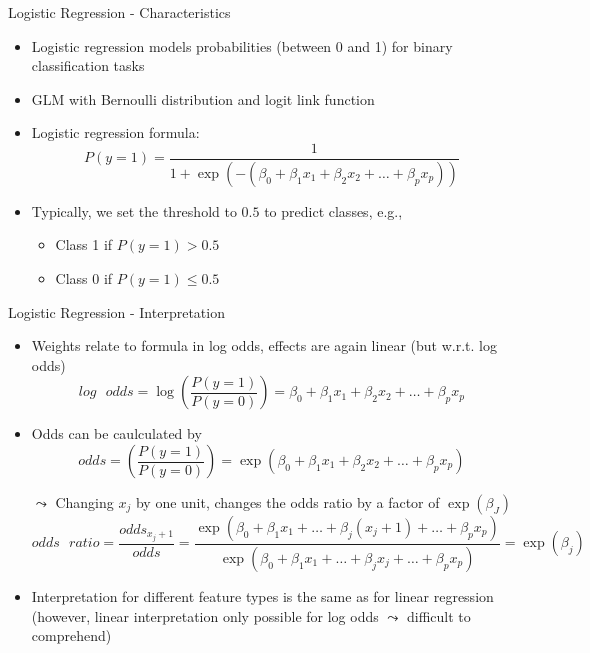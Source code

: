 \documentclass[11pt,compress,t,notes=noshow, aspectratio=169, xcolor=table]{beamer}
\begin{document}
\begin{frame}{Logistic Regression - Characteristics}

\begin{itemize}
    \item Logistic regression models probabilities (between 0 and 1) for binary classification tasks 
    \item GLM with Bernoulli distribution and logit link function
    \item Logistic regression formula:
    $$P(y = 1) =\frac{1}{1 + \exp(-( \beta_0 + \beta_1 x_1 + \beta_2 x_2 + \ldots + \beta_p x_p ))} $$
    \item Typically, we set the threshold to $0.5$ to predict classes, e.g.,
        \begin{itemize}
            \item Class 1 if $P(y=1) > 0.5$
            \item Class 0 if $P(y=1) \leq 0.5$
        \end{itemize}
\end{itemize}
    

	

\end{frame}


\begin{frame}[c]{Logistic Regression - Interpretation}

    
    
    
    

    \begin{itemize}
        \item Weights relate to formula in log odds, effects are again linear (but w.r.t. log odds)
        $$log\text{ }odds = \log \left(\frac{P(y = 1)}{P(y=0)}\right) = \beta_0 + \beta_1 x_1 + \beta_2 x_2 + \ldots + \beta_p x_p  $$
        \pause
        \item Odds can be caulculated by 
        $$odds = \left(\frac{P(y = 1)}{P(y=0)}\right) = \exp(\beta_0 + \beta_1 x_1 + \beta_2 x_2 + \ldots + \beta_p x_p)  $$
        \item[$\leadsto$] Changing $x_j$ by one unit, changes the odds ratio by a \alert{factor} of $\exp(\beta_J)$
        $$odds\text{ }ratio = \frac{odds_{x_j+1}}{odds} = \frac{\exp(\beta_0 + \beta_1 x_1 + \ldots + \beta_j (x_j+1) + \ldots + \beta_p x_p)}{\exp(\beta_0 + \beta_1 x_1 + \ldots + \beta_j x_j + \ldots + \beta_p x_p)} = \exp{(\beta_j)} $$
        \pause
        \item Interpretation for different feature types is the same as for linear regression (however, linear interpretation only possible for log odds $\leadsto$ difficult to comprehend)
    \end{itemize}	

\end{frame}
\end{document}
